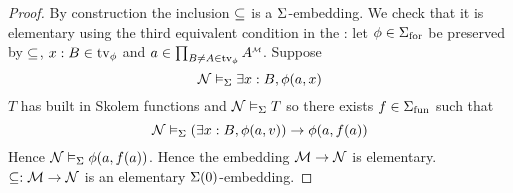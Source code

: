 \begin{proof}
    By construction the inclusion $\subseteq$ is a $\Sigma$-embedding. 
    We check that it is elementary using the third equivalent condition in the
    :
    let $\phi \in {\Sigma}_\mathrm{for}$ be preserved by $\subseteq$,
    $x : B \in \textrm{tv}_{\phi}$ 
    and $a \in \prod_{B \ne A \in \tv{\phi}} \mmintp{A}$.
    Suppose
    \[\mathcal{N} \vDash_{\Sigma} \exists x : B, \phi(a,x)\] 
    $T$ has built in Skolem functions and $\mathcal{N} \vDash_{\Sigma} T$ so
    there exists $f \in {\Sigma}_\mathrm{fun}$ such that
    \[
        \mathcal{N} \vDash_{\Sigma} (\exists x : B, \phi(a,v)) \to \phi(a,f(a)) 
    \]
    Hence $\mathcal{N} \vDash_{\Sigma} \phi(a,f(a))$.
    Hence the embedding $\mathcal{M} \to \mathcal{N}$ is elementary.
     $\subseteq : \mathcal{M} \to \mathcal{N}$ 
    is an elementary $\Sigma(0)$-embedding.
\end{proof}
